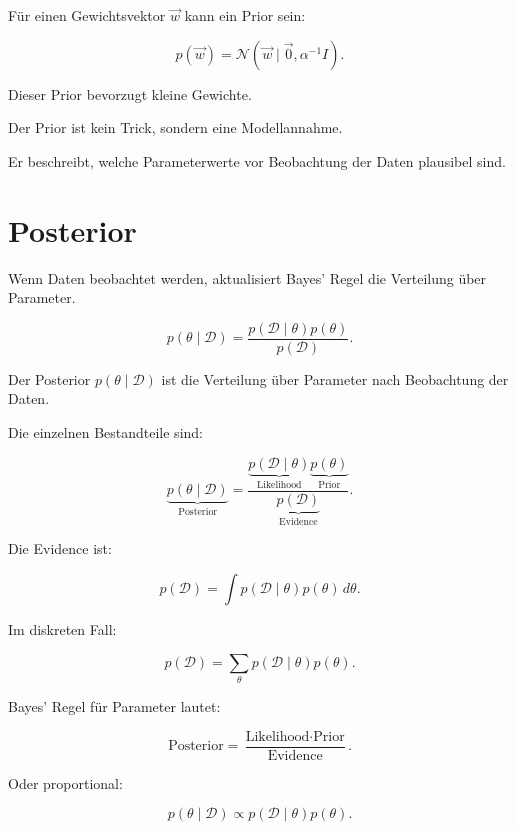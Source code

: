 Für einen Gewichtsvektor \(\vec{w}\) kann ein Prior sein:

\[
    p(\vec{w})
    =
    \mathcal{N}
    \left(
        \vec{w}
        \mid
        \vec{0},
        \alpha^{-1}I
    \right).
\]

Dieser Prior bevorzugt kleine Gewichte.

\begin{notebox}
Der Prior ist kein Trick, sondern eine Modellannahme.

Er beschreibt, welche Parameterwerte vor Beobachtung der Daten plausibel sind.
\end{notebox}

\section{Posterior}

Wenn Daten beobachtet werden, aktualisiert Bayes' Regel die Verteilung über Parameter.

\[
    p(\theta \mid \mathcal{D})
    =
    \frac{
        p(\mathcal{D} \mid \theta)p(\theta)
    }{
        p(\mathcal{D})
    }.
\]

\begin{definitionbox}
Der Posterior \(p(\theta \mid \mathcal{D})\) ist die Verteilung über Parameter nach Beobachtung der Daten.
\end{definitionbox}

Die einzelnen Bestandteile sind:

\[
    \underbrace{p(\theta \mid \mathcal{D})}_{\text{Posterior}}
    =
    \frac{
        \underbrace{p(\mathcal{D} \mid \theta)}_{\text{Likelihood}}
        \underbrace{p(\theta)}_{\text{Prior}}
    }{
        \underbrace{p(\mathcal{D})}_{\text{Evidence}}
    }.
\]

Die Evidence ist:

\[
    p(\mathcal{D})
    =
    \int
    p(\mathcal{D} \mid \theta)
    p(\theta)
    \,d\theta.
\]

Im diskreten Fall:

\[
    p(\mathcal{D})
    =
    \sum_{\theta}
    p(\mathcal{D} \mid \theta)
    p(\theta).
\]

\begin{conceptbox}
Bayes' Regel für Parameter lautet:

\[
    \text{Posterior}
    =
    \frac{
        \text{Likelihood}
        \cdot
        \text{Prior}
    }{
        \text{Evidence}
    }.
\]

Oder proportional:

\[
    p(\theta \mid \mathcal{D})
    \propto
    p(\mathcal{D} \mid \theta)p(\theta).
\]
\end{conceptbox}

